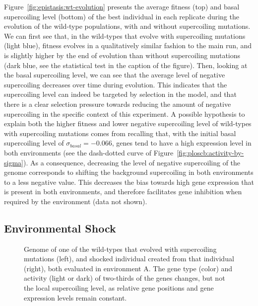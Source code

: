 Figure~\ref{fig:epistasis:wt-evolution} presents the average fitness (top) and basal supercoiling level (bottom) of the best individual in each replicate during the evolution of the wild-type populations, with and without supercoiling mutations.
We can first see that, in the wild-types that evolve with supercoiling mutations (light blue), fitness evolves in a qualitatively similar fashion to the main run, and is slightly higher by the end of evolution than without supercoiling mutations (dark blue, see the statistical test in the caption of the figure).
Then, looking at the basal supercoiling level, we can see that the average level of negative supercoiling decreases over time during evolution.
This indicates that the supercoiling level can indeed be targeted by selection in the model, and that there is a clear selection pressure towards reducing the amount of negative supercoiling in the specific context of this experiment.
A possible hypothesis to explain both the higher fitness and lower negative supercoiling level of wild-types with supercoiling mutations comes from recalling that, with the initial basal supercoiling level of $\sigma_{basal} = -0.066$, genes tend to have a high expression level in both environments (see the dash-dotted curve of Figure~\ref{fig:ploscb:activity-by-sigma}).
As a consequence, decreasing the level of negative supercoiling of the genome corresponds to shifting the background supercoiling in both environments to a less negative value.
This decreases the bias towards high gene expression that is present in both environments, and therefore facilitates gene inhibition when required by the environment (data not shown).

\subsection{Environmental Shock}

\begin{figure}
\centering
\begin{elasticrow}[width=\textwidth]
\end{elasticrow}
\caption[Evolved wild-type individual before and after an environmental shock]{Genome of one of the wild-types that evolved with supercoiling mutations (left), and shocked individual created from that individual (right), both evaluated in environment A.
The gene type (color) and activity (light or dark) of two-thirds of the genes changes, but not the local supercoiling level, as relative gene positions and gene expression levels remain constant.}
\label{fig:epistasis:shock}
\end{figure}

